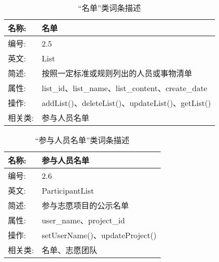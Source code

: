 \begin{table}[H]  
\caption{“名单”类词条描述}  
\begin{center}  
    \begin{tabular}{l p{11cm}} 
        \hline
        \quad 名称:  &  名单 \\
        \hline
        \quad 编号:  & 2.5 \\
        \hline
        \quad 英文:  &  List \\
        \hline
        \quad 简述:  & 按照一定标准或规则列出的人员或事物清单 \\
        \hline
        \quad 属性:  &list\_id、list\_name、list\_content、create\_date\\
        \hline
        \quad 操作:  & addList()、deleteList()、updateList()、getList() \\
        \hline
        \quad 相关类:  & 参与人员名单 \\
        \hline
    \end{tabular}
\end{center}
\end{table}

\begin{table}[H]  
\caption{“参与人员名单”类词条描述}  
\begin{center}  
    \begin{tabular}{l p{11cm}} 
        \hline
        \quad 名称:  &  参与人员名单 \\
        \hline
        \quad 编号:  & 2.6 \\
        \hline
        \quad 英文:  &  ParticipantList \\
        \hline
        \quad 简述:  & 参与志愿项目的公示名单 \\
        \hline
        \quad 属性:  & user\_name、project\_id
\\
        \hline
        \quad 操作:  & setUserName()、updateProject()

\\
        \hline
        \quad 相关类:  & 名单、志愿团队 \\
        \hline
    \end{tabular}
\end{center}
\end{table}

